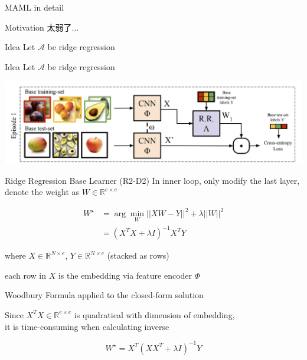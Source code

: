 \documentclass{beamer}
\begin{document}
\begin{fraMe}[t]{MAML in detail}
\begin{frame}[t]{Motivation}
  \pause
  \vspace{2cm}
  \center \LARGE{太弱了...}
\end{frame}

\begin{frame}[t]{Idea}
  Let $\mathcal{A}$ be ridge regression
\end{frame}

\begin{frame}[t]{Idea}
  Let $\mathcal{A}$ be ridge regression

  \vspace{1cm}
  \includegraphics[width=\textwidth]{fig/r2d2.png}
\end{frame}

\begin{frame}[t]{Ridge Regression Base Learner (R2-D2)}
  In inner loop, only modify the last layer, denote the weight as $W \in \mathbb{R}^{e \times c}$

  \begin{equation*}
    \begin{aligned}
      W^\star &= \arg\min_W || XW-Y ||^2 + \lambda ||W||^2 \\
              &= (X^TX + \lambda I)^{-1} X^TY
    \end{aligned}
  \end{equation*}

  where $X \in \mathbb{R}^{N \times e}$, $Y \in \mathbb{R}^{N \times c}$ (stacked as rows)

  each row in $X$ is the embedding via feature encoder $\Phi$
\end{frame}

\begin{frame}[t]{Woodbury Formula applied to the closed-form solution}

  Since $X^T X \in  \mathbb{R}^{e \times e}$ is quadratical with dimension of embedding, \\
  it is time-consuming when calculating inverse

  \begin{equation*}
    \boxed{W^\star = X^T(X X^T + \lambda I)^{-1}Y}
  \end{equation*}


\end{frame}
\end{fraMe}
\end{document}
